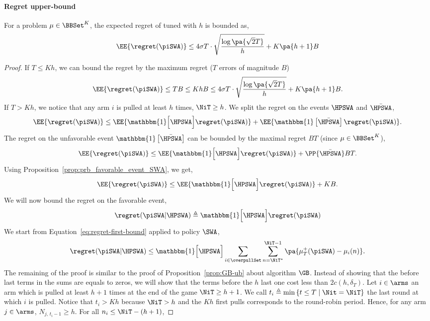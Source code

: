 \paragraph{Regret upper-bound}
%
\begin{proposition}
\label{prop:SWA}
For a problem $\mu \in \BBSet^K$, the expected regret of \SWA tuned with $h$ is bounded as,
 \[
\EE{\regret(\piSWA)} \leq 4\sigma T\cdot\sqrt{\frac{\log\pa{\sqrt{2}T}}{h}} + K\pa{h+1}B
 \]
\end{proposition}
%
\begin{proof}
If $T \leq Kh$, we can bound the regret by the maximum regret ($T$ errors of magnitude $B$)
\[
\EE{\regret(\piSWA)} \leq TB \leq KhB \leq 4\sigma T\cdot\sqrt{\frac{\log\pa{\sqrt{2}T}}{h}} + K\pa{h+1}B.
\]
%
If $T > Kh$, we notice that any arm $i$ is pulled at least $h$ times, \ie $\NiT \geq h$. We split the regret on the events $\HPSWA$ and $\bar{\HPSWA}$, 
\[
\EE{\regret(\piSWA)} \leq \EE{\mathbbm{1} \Big[\HPSWA\Big] \regret(\piSWA)} + \EE{\mathbbm{1} \left[\bar{\HPSWA}\right] \regret(\piSWA)}.
\]
%
The regret on the unfavorable event $\mathbbm{1} \left[\bar{\HPSWA}\right]$ can be bounded by the maximal regret $BT$ (since $\mu \in \BBSet^K$), 
\[
\EE{\regret(\piSWA)} \leq  \EE{\mathbbm{1} \Big[\HPSWA\Big] \regret(\piSWA)} + \PP{\bar{\HPSWA}} BT.
\]
%
Using Proposition~\ref{prop:prb_favorable_event_SWA}, we get,
\begin{equation}
\label{eq:regret-unfav-event-SWA}
\EE{\regret(\piSWA)} \leq  \EE{\mathbbm{1} \Big[\HPSWA\Big]  \regret(\piSWA)} + KB.
\end{equation}
%
We will now bound the regret on the favorable event,
\[
\regret(\piSWA | \HPSWA) \triangleq \mathbbm{1} \Big[\HPSWA\Big]  \regret(\piSWA)
\]
%
We start from Equation~\ref{eq:regret-first-bound} applied to policy $\SWA$,
\begin{equation}
\label{eq:regret-first-bound-SWA}
\regret(\piSWA| \HPSWA) \leq  \mathbbm{1} \Big[\HPSWA\Big] \sum_{i\in \overpullSet}    \sum_{n=\NiT^\star}^{\NiT-1} \pa{\mu^+_T(\piSWA) - \mu_i(n)}.
\end{equation}
%
The remaining of the proof is similar to the proof of Proposition~\ref{prop:GB-ub} about algorithm $\GB$. Instead of showing that the before last terms in the sums are equals to zeros, we will show that the terms before the $h$ last one cost less than $2c(h, \delta_T)$. Let $i \in \arms$ an arm which is pulled at least $h+1$ times at the end of the game $\NiT \geq h+1$. We call $t_i \triangleq \min\left\{t\leq T\; |\; \Nit = \NiT\right\}$ the last round at which $i$ is pulled. Notice that $t_i > Kh$ because $\NiT > h$ and the $Kh$ first pulls corresponds to the round-robin period. Hence, for any arm $j \in \arms$, $N_{j,\,t_i -1} \geq h$. For all $n_i \leq \NiT -(h+1)$, 

\end{proof}

